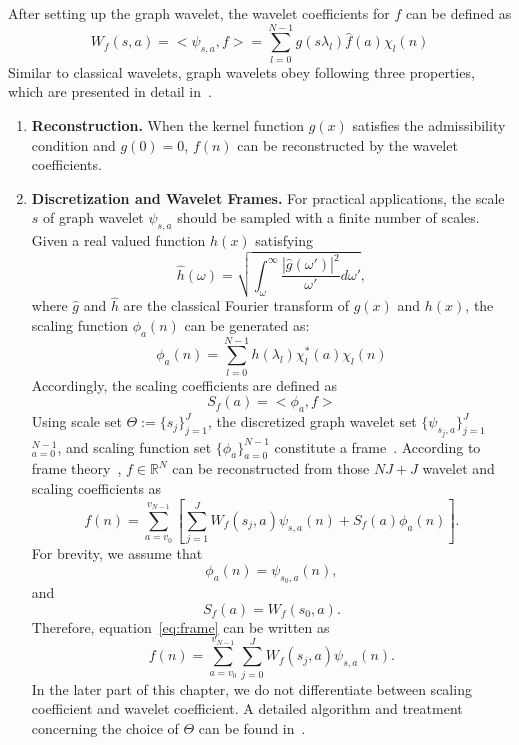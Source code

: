 After setting up the graph wavelet, the wavelet coefficients for $f$ can be defined as
\begin{equation}
\label{eq:graph_graphwavelet}
W_f(s,a)=<\psi_{s,a}, f>=\sum\limits_{l=0}^{N-1}g(s\lambda_l)\hat{f}(a)\chi_l(n)
\end{equation}
Similar to classical wavelets, graph wavelets obey following three properties, which are presented in detail in~\cite{hammond2011wavelets}.
 \begin{enumerate}
 \item \textbf{Reconstruction.}
 When the kernel function $g(x)$ satisfies the admissibility condition and $g(0)=0$,  $f(n)$ can be reconstructed by the wavelet coefficients.
\item \textbf{Discretization and Wavelet Frames.} For practical applications, the
scale $s$ of graph wavelet $\psi_{s,a}$ should be sampled with a finite number of scales. Given a real valued function $h(x)$ satisfying
\begin{equation}
\hat{h}(\omega) = \sqrt{\int_\omega^\infty\frac{|\hat{g}(\omega')|^2}{\omega'}d{\omega'} },
\end{equation}
where $\hat{g}$ and $\hat{h}$ are the classical Fourier transform of $g(x)$ and $h(x)$, the scaling function $\phi_{a}(n)$ can be generated as:
\begin{equation}
\label{eq:graphscaledefinition}
\phi_{a}(n) = \sum\limits_{l=0}^{N-1}h(\lambda_l)\chi_l^*(a)\chi_l(n)
\end{equation}
Accordingly, the scaling coefficients are defined as
\begin{equation}
S_f(a)=<\phi_a,f>
\end{equation}
Using scale set $\Theta:=\{s_j\}_{j=1}^J$, the discretized graph wavelet set $\{\psi_{s_j,a}\}_{j=1}^{J}$ $_{a=0}^{N-1}$, and scaling function set $\{\phi_a\}_{a=0}^{N-1}$ constitute a frame~\cite{hammond2011wavelets}.
According to frame theory~\cite{daubechies1992ten}, $f\in \mathbb{R}^N$ can be reconstructed from those $NJ+J$ wavelet and scaling coefficients as
\begin{equation}
\label{eq:frame}
f(n)=\sum_{a=v_0}^{v_{N-1}}[\sum_{j=1}^{J}W_{f}(s_j,a)\psi_{s,a}(n)+S_f(a)\phi_{a}(n)].
\end{equation}For brevity, we assume that
\begin{equation}
\phi_a(n)=\psi_{s_0,a}(n),
\end{equation} and
\begin{equation}
S_f(a)=W_f(s_0,a).
\end{equation}Therefore, equation~\ref{eq:frame} can be written as
\begin{equation}
\label{eq:frame2}
f(n)=\sum_{a=v_0}^{v_{N-1}}\sum_{j=0}^{J}W_{f}(s_j,a)\psi_{s,a}(n).
\end{equation}In the later part of this chapter, we do not differentiate between
scaling coefficient and wavelet coefficient.
A detailed algorithm and treatment concerning the choice of $\Theta$ can be found in~\cite{hammond2011wavelets}.





\end{enumerate}
